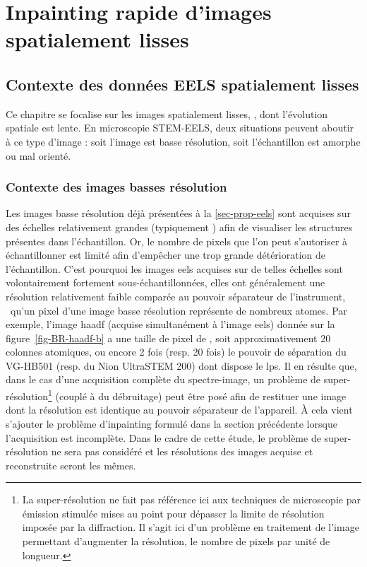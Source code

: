 \chapter{Inpainting rapide d'images spatialement lisses}
\label{ch-chapter_3}
\dochaptoc
%
\section{Contexte des données EELS spatialement lisses}

Ce chapitre se focalise sur les images spatialement lisses, \ie{}, dont l'évolution spatiale est lente. En microscopie STEM-EELS, deux situations peuvent aboutir à ce type d'image : soit l'image est basse résolution, soit l'échantillon est amorphe ou mal orienté.

\subsection{Contexte des images basses résolution}\label{sec-donnees-sous-echantillonnees}


Les images basse résolution déjà présentées à la \cref{sec-prop-eels} sont acquises sur des échelles relativement grandes (typiquement ) afin de visualiser les structures présentes dans l'échantillon. 
%
Or, le nombre de pixels que l'on peut s'autoriser à échantillonner est limité afin d'empêcher une trop grande détérioration de l'échantillon. 
%
C'est pourquoi les images \gls{eels} acquises sur de telles échelles sont volontairement fortement sous-échantillonnées, elles ont généralement une résolution relativement faible comparée au pouvoir séparateur de l'instrument, \ie\ qu'un pixel d'une image basse résolution représente de nombreux atomes. 
%
Par exemple, l'image \gls{haadf} (acquise simultanément à l'image \gls{eels}) donnée sur la figure~\ref{fig-BR-haadf-b} a une taille de pixel de , soit approximativement 20 colonnes atomiques, ou encore 2 fois (resp. 20 fois) le pouvoir de séparation du VG-HB501 (resp. du Nion UltraSTEM 200) dont dispose le \gls{lps}.
%
Il en résulte que, dans le cas d'une acquisition complète du spectre-image, un problème de super-résolution\footnote{La super-résolution ne fait pas référence ici aux techniques de microscopie par émission stimulée mises au point pour dépasser la limite de résolution imposée par la diffraction. Il s'agit ici d'un problème en traitement de l'image permettant d'augmenter la résolution, \ie{} le nombre de pixels par unité de longueur.} (couplé à du débruitage) peut être posé afin de restituer une image dont la résolution est identique au pouvoir séparateur de l'appareil. \`A cela vient s'ajouter le problème d'inpainting formulé dans la section précédente lorsque l'acquisition est incomplète. Dans le cadre de cette étude, le problème de super-résolution ne sera pas considéré et les résolutions des images acquise et reconstruite seront les mêmes.

